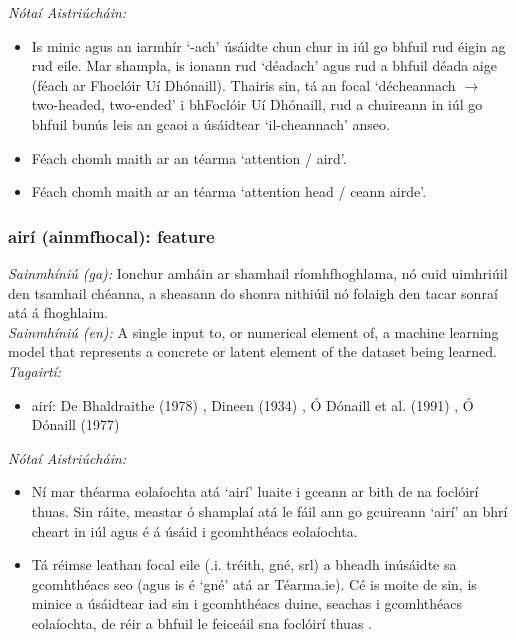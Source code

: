  \noindent \textit{Nótaí Aistriúcháin:}
\begin{itemize}
	\item Is minic agus an iarmhír `-ach' úsáidte chun chur in iúl go bhfuil rud éigin ag rud eile. Mar shampla, is ionann rud `déadach' agus rud a bhfuil déada aige (féach ar Fhoclóir Uí Dhónaill). Thairis sin, tá an focal `décheannach $\rightarrow$ two-headed, two-ended' i bhFoclóir Uí Dhónaill, rud a chuireann in iúl go bhfuil bunús leis an gcaoi a úsáidtear `il-cheannach' anseo.
	\item Féach chomh maith ar an téarma `attention / aird'.
	\item Féach chomh maith ar an téarma `attention head / ceann airde'.
\end{itemize}


\subsubsection*{airí (ainmfhocal): feature}
 \noindent \textit{Sainmhíniú (ga):} Ionchur amháin ar shamhail ríomhfhoghlama, nó cuid uimhriúil den tsamhail chéanna, a sheasann do shonra nithiúil nó folaigh den tacar sonraí atá á fhoghlaim.
\\
 \noindent \textit{Sainmhíniú (en):} A single input to, or numerical element of, a machine learning model that represents a concrete or latent element of the dataset being learned.
\\
 \noindent \textit{Tagairtí:}
\begin{itemize}
	\item airí: De Bhaldraithe (1978) \cite{de-bhaldraithe}, Dineen (1934) \cite{dineen}, Ó Dónaill et al. (1991) \cite{focloir-beag}, Ó Dónaill (1977) \cite{odonaill}
\end{itemize}

 \noindent \textit{Nótaí Aistriúcháin:}
\begin{itemize}
	\item Ní mar théarma eolaíochta atá `airí' luaite i gceann ar bith de na foclóirí thuas. Sin ráite, meastar ó shamplaí atá le fáil ann go gcuireann `airí' an bhrí cheart in iúl agus é á úsáid i gcomhthéacs eolaíochta.
	\item Tá réimse leathan focal eile (.i. tréith, gné, srl) a bheadh inúsáidte sa gcomhthéacs seo (agus is é `gné' atá ar Téarma.ie). Cé is moite de sin, is minice a úsáidtear iad sin i gcomhthéacs duine, seachas i gcomhthéacs eolaíochta, de réir a bhfuil le feiceáil sna foclóirí thuas .
\end{itemize}


